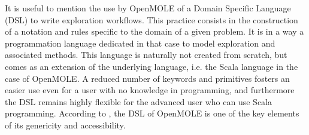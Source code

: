\documentclass[10pt]{article}
\begin{document}
It is useful to mention the use by OpenMOLE of a Domain Specific Language (DSL) \citep{} to write exploration workflows. This practice consists in the construction of a notation and rules specific to the domain of a given problem. It is in a way a programmation language dedicated in that case to model exploration and associated methods. This language is naturally not created from scratch, but comes as an extension of the underlying language, i.e. the Scala language in the case of OpenMOLE. A reduced number of keywords and primitives fosters an easier use even for a user with no knowledge in programming, and furthermore the DSL remains highly flexible for the advanced user who can use Scala programming. According to \cite{}, the DSL of OpenMOLE is one of the key elements of its genericity and accessibility.
\end{document}
